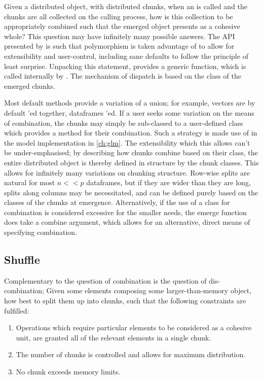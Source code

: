 Given a distributed object, with distributed chunks, when an  is called and the chunks are all collected on the calling process, how is this collection to be appropriately combined such that the emerged object presents as a cohesive whole?
This question may have infinitely many possible answers.
The API presented by \lsr{} is such that polymorphism is taken advantage of to allow for extensibility and user-control, including sane defaults to follow the principle of least surprise.
Unpacking this statement, \lsr{} provides a generic  function, which is called internally by .
The mechanism of dispatch is based on the class of the emerged chunks.

Most default  methods provide a variation of a union; for example, vectors are by default 'ed together, dataframes 'ed.
If a user seeks some variation on the means of combination, the chunks may simply be sub-classed to a user-defined class which provides a  method for their combination.
Such a strategy is made use of in the model implementation in \cref{ch:glm}.
The extensibility which this allows can't be under-emphasised; by describing how chunks combine based on their class, the entire distributed object is thereby defined in structure by the chunk classes.
This allows for infinitely many variations on chunking structure.
Row-wise splits are natural for most $n<<p$ dataframes, but if they are wider than they are long, splits along columns may be necessitated, and can be defined purely based on the classes of the chunks at emergence.
Alternatively, if the use of a class for combination is considered excessive for the smaller needs, the emerge function does take a combine argument, which allows for an alternative, direct means of specifying combination.

\subsection{Shuffle}\label{sec:shuffle}

Complementary to the question of combination is the question of dis-combination; Given some elements composing some larger-than-memory object, how best to split them up into chunks, such that the following constraints are fulfilled:

\begin{enumerate} \item Operations which require particular elements to be considered as a cohesive unit, are granted all of the relevant elements in a single chunk.
	\item The number of chunks is controlled and allows for maximum distribution.
	\item No chunk exceeds memory limits.
\end{enumerate}

